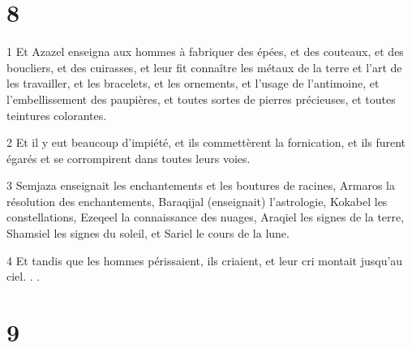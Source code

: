 \chapter{8}

\par 1 Et Azazel enseigna aux hommes à fabriquer des épées, et des couteaux, et des boucliers, et des cuirasses, et leur fit connaître les métaux de la terre et l'art de les travailler, et les bracelets, et les ornements, et l'usage de l'antimoine, et l'embellissement des paupières, et toutes sortes de pierres précieuses, et toutes teintures colorantes.
\par 2 Et il y eut beaucoup d'impiété, et ils commettèrent la fornication, et ils furent égarés et se corrompirent dans toutes leurs voies.
\par 3 Semjaza enseignait les enchantements et les boutures de racines, Armaros la résolution des enchantements, Baraqijal (enseignait) l'astrologie, Kokabel les constellations, Ezeqeel la connaissance des nuages, Araqiel les signes de la terre, Shamsiel les signes du soleil, et Sariel le cours de la lune.
\par 4 Et tandis que les hommes périssaient, ils criaient, et leur cri montait jusqu'au ciel. . .

\chapter{9}

